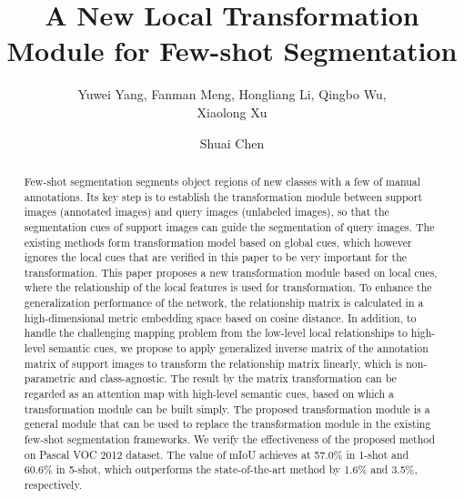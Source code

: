 \documentclass[runningheads]{llncs}
\begin{document}
\title{
A New Local Transformation Module for Few-shot Segmentation
}
\author{Yuwei Yang, Fanman Meng, Hongliang Li,
Qingbo Wu, \\Xiaolong Xu \and
Shuai Chen}
\maketitle              \begin{abstract}
Few-shot segmentation segments object regions of new classes with a few of manual annotations. Its key step is to establish the transformation module between support images (annotated images) and query images (unlabeled images), so that the segmentation cues of support images can guide the segmentation of query images. The existing methods form transformation model based on global cues, which however ignores the local cues that are verified in this paper to be very important for the transformation. This paper proposes a new transformation module based on local cues, where the relationship of the local features is used for transformation. 
To enhance the generalization performance of the network, the relationship matrix is calculated in a high-dimensional metric embedding space based on cosine distance. In addition, to handle the challenging mapping problem from the low-level local relationships to high-level semantic cues, we propose to apply generalized inverse matrix of the annotation matrix of support images to transform the relationship matrix linearly, which is non-parametric and class-agnostic. The result by the matrix transformation can be regarded as an attention map with high-level semantic cues, based on which a transformation module can be built simply.
The proposed transformation module is a general module that can be used to replace the transformation module in the existing few-shot segmentation frameworks. We verify the effectiveness of the proposed method on Pascal VOC 2012 dataset. The value of mIoU achieves at 57.0\% in 1-shot and 60.6\% in 5-shot, which outperforms the state-of-the-art method by 1.6\% and 3.5\%, respectively.

\end{abstract}
\end{document}
